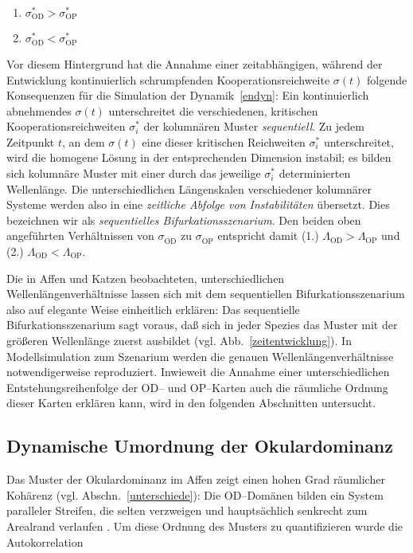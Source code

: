 \begin{enumerate}
\item $\sigma_{\text{OD}}^\ast > \sigma_{\text{OP}}^\ast$
\item $\sigma_{\text{OD}}^\ast < \sigma_{\text{OP}}^\ast$
\end{enumerate}

Vor diesem Hintergrund hat die Annahme einer zeitabhängigen, während der
Entwicklung kontinuierlich schrumpfenden Kooperationsreichweite $\sigma(t)$
folgende Konsequenzen für die Simulation der Dynamik~\eqref{endyn}: Ein
kontinuierlich abnehmendes $\sigma(t)$ unterschreitet die verschiedenen,
kritischen Kooperationsreichweiten $\sigma_i^\ast$ der
kolumnären Muster \emph{sequentiell}. Zu jedem Zeitpunkt $t$, an dem
$\sigma(t)$ eine dieser kritischen Reichweiten $\sigma_i^\ast$
unterschreitet, wird die homogene Lösung in der entsprechenden Dimension
instabil; es bilden sich kolumnäre Muster mit einer durch das jeweilige
$\sigma_i^\ast$ determinierten Wellenlänge.  Die unterschiedlichen
Längenskalen verschiedener kolumnärer Systeme werden also in eine
\emph{zeitliche Abfolge von Instabilitäten} übersetzt. Dies bezeichnen
wir als \emph{sequentielles Bifurkationsszenarium}.  Den beiden oben
angeführten Verhältnissen von $\sigma_{\text{OD}}^{\phantom{\ast}}$ zu
$\sigma_{\text{OP}}^{\phantom{\ast}}$ entspricht damit (1.)
$\Lambda_{\text{OD}} > \Lambda_{\text{OP}}$ und (2.) $\Lambda_{\text{OD}} <
\Lambda_{\text{OP}}$.

Die in Affen und Katzen beobachteten, unterschiedlichen
Wellenlängenverhältnisse lassen sich mit dem sequentiellen
Bifurkationsszenarium also auf elegante Weise einheitlich erklären: Das
sequentielle Bifurkationsszenarium sagt voraus, daß sich in jeder Spezies
das Muster mit der größeren Wellenlänge zuerst ausbildet
(vgl. Abb.~\ref{zeitentwicklung}). In Modellsimulation zum Szenarium
werden die genauen Wellenlängenverhältnisse notwendigerweise
reproduziert.  Inwieweit die Annahme einer unterschiedlichen
Entstehungsreihenfolge der OD-- und OP--Karten auch die räumliche Ordnung
dieser Karten erklären kann, wird in den folgenden Abschnitten untersucht.

\subsection{Dynamische Umordnung der Okulardominanz}
\label{odord}

Das Muster der Okulardominanz im Affen zeigt einen hohen Grad räumlicher
Kohärenz (vgl. Abschn.~\ref{unterschiede}): Die OD--Domänen bilden ein
System paralleler Streifen, die selten verzweigen und hauptsächlich
senkrecht zum Arealrand verlaufen . Um diese Ordnung des Musters zu quantifizieren wurde die
Autokorrelation

